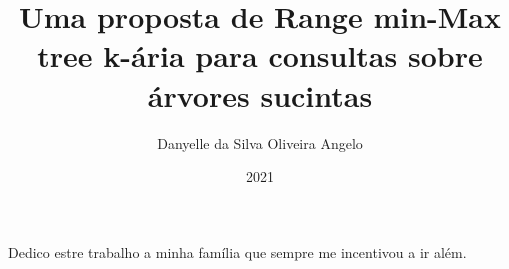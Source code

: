 \documentclass[pt,twoside,onehalfspacing,bsc]{ifbclass/ifbclass}
\title{Uma proposta de Range min-Max tree k-ária para consultas sobre árvores sucintas}
\date{2021}
\author{Danyelle da Silva Oliveira Angelo}
\begin{document}
  
  \frontmatter
  
  \frontpage
  
  \presentationpage
  
  \begin{fichacatalografica}
    \FakeFichaCatalografica %
  \end{fichacatalografica}
  

  
  \begin{dedicatory}
    Dedico estre trabalho a minha família que sempre me incentivou a ir além.
  \end{dedicatory}
  
  \acknowledgements
  
  
  
  \resumo
  {\parindent0pt
    
  }
  
  \abstract
  {\parindent0pt
    
  }
  

  \tableofcontents
  
  \mainmatter
  
 
  
  
  
  
 
  \begin{references}
    
  \end{references}
  
 
\end{document}
